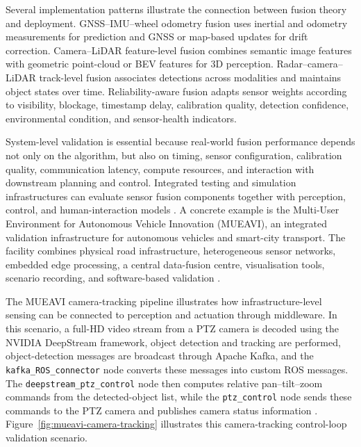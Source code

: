 \documentclass[11pt,oneside,openany]{book}
\begin{document}
Several implementation patterns illustrate the connection between fusion theory and deployment. GNSS--IMU--wheel odometry fusion uses inertial and odometry measurements for prediction and GNSS or map-based updates for drift correction. Camera--LiDAR feature-level fusion combines semantic image features with geometric point-cloud or BEV features for 3D perception. Radar--camera--LiDAR track-level fusion associates detections across modalities and maintains object states over time. Reliability-aware fusion adapts sensor weights according to visibility, blockage, timestamp delay, calibration quality, detection confidence, environmental condition, and sensor-health indicators.

System-level validation is essential because real-world fusion performance depends not only on the algorithm, but also on timing, sensor configuration, calibration quality, communication latency, compute resources, and interaction with downstream planning and control. Integrated testing and simulation infrastructures can evaluate sensor fusion components together with perception, control, and human-interaction models \cite{deliparaschos_preliminary_2020}. A concrete example is the Multi-User Environment for Autonomous Vehicle Innovation (MUEAVI), an integrated validation infrastructure for autonomous vehicles and smart-city transport. The facility combines physical road infrastructure, heterogeneous sensor networks, embedded edge processing, a central data-fusion centre, visualisation tools, scenario recording, and software-based validation \cite{deliparaschos_preliminary_2020}.

The MUEAVI camera-tracking pipeline illustrates how infrastructure-level sensing can be connected to perception and actuation through middleware. In this scenario, a full-HD video stream from a PTZ camera is decoded using the NVIDIA DeepStream framework, object detection and tracking are performed, object-detection messages are broadcast through Apache Kafka, and the \texttt{kafka\_ROS\_connector} node converts these messages into custom ROS messages. The \texttt{deepstream\_ptz\_control} node then computes relative pan--tilt--zoom commands from the detected-object list, while the \texttt{ptz\_control} node sends these commands to the PTZ camera and publishes camera status information \cite{deliparaschos_preliminary_2020}. Figure~\ref{fig:mueavi-camera-tracking} illustrates this camera-tracking control-loop validation scenario.
\end{document}
